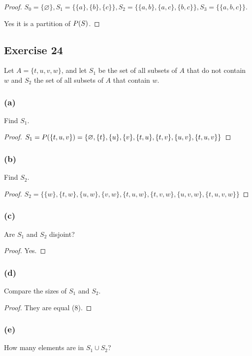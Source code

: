 \documentclass[14pt]{extarticle}
\let\mathscr\relax
\newcommand{\ps}{\mathscr{P}}
\newcommand{\es}{\varnothing}
\begin{document}
\begin{proof}
\(S_0 = \{\es\}, S_1 = \{\{a\}, \{b\}, \{c\}\}, S_2 = \{\{a,b\}, \{a,c\}, \{b,c\}\}, S_3 = \{\{a,b,c\}\}\).

Yes it is a partition of $\ps(S)$.
\end{proof}

\subsection{Exercise 24}
Let \(A = \{t, u, v, w\}\), and let $S_1$ be the set of all subsets of $A$ that do not contain $w$ and $S_2$ the set of all subsets of $A$ that contain $w$.

\subsubsection{(a)}
Find $S_1$.

\begin{proof}
\(S_1 = \ps(\{t,u,v\}) = \{\es, \{t\}, \{u\}, \{v\}, \{t,u\}, \{t,v\}, \{u,v\}, \{t,u,v\}\}\)
\end{proof}

\subsubsection{(b)}
Find $S_2$.

\begin{proof}
\(S_2 = \{\{w\}, \{t,w\}, \{u,w\}, \{v,w\}, \{t,u,w\}, \{t,v,w\}, \{u,v,w\}, \{t,u,v,w\}\}\)
\end{proof}

\subsubsection{(c)}
Are $S_1$ and $S_2$ disjoint?

\begin{proof}
Yes.
\end{proof}

\subsubsection{(d)}
Compare the sizes of $S_1$ and $S_2$.

\begin{proof}
They are equal (8).
\end{proof}

\subsubsection{(e)}
How many elements are in \(S_1 \cup S_2\)?
\end{document}
